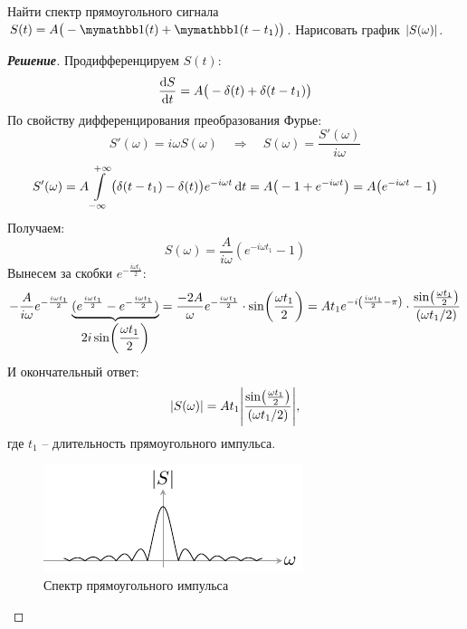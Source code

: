 \begin{task}
	Найти спектр прямоугольного сигнала $S(t)=A\big(-\H(t)+\H(t-t_1)\big)$.
	Нарисовать график $\abs{S(\omega)}$.
\end{task}

\begin{proof}[\rm{\textbf{Решение}}]
	Продифференцируем $S(t)$:
	\begin{equation}
		\dv{S}{t}=A\big(-\delta(t)+\delta(t-t_1)\big)
	\end{equation}
	По свойству дифференцирования преобразования Фурье:
	\begin{equation}
		S'(\omega)=i \omega S(\omega) 
			\quad\Longrightarrow\quad
			S(\omega)=\frac{S'(\omega)}{i \omega}
	\end{equation}
	\begin{gather*}
		S'(\omega)=A\int\limits_{-\infty}^{+\infty} \big(\delta(t-t_1)-\delta(t)\big)e^{-i \omega t} \dd{t}
			=A\big(-1 +e^{-i \omega t}\big) = A\big(e^{-i \omega t} -1\big)
	\end{gather*}
	Получаем:
	\begin{equation}
		S(\omega)=\frac{A}{i \omega} (e^{-i \omega t_1}-1)
	\end{equation}
	Вынесем за скобки $e^{-\frac{i \omega t_1}{2}}$:
	\begin{equation}
		-\frac{A}{i \omega} e^{-\frac{i \omega t_1}{2}}
		\underbrace{
			(e^{\frac{i \omega t_1}{2}} 
			-e^{-\frac{i \omega t_1}{2}})}
			_{\displaystyle 2i\sin(\frac{\omega t_1}{2})}=
		\frac{-2A}{\omega}
			e^{-\frac{i \omega t_1}{2}}
			\cdot\sin(\frac{\omega t_1}{2})=\\
		At_1e^{-i\qty(\frac{i \omega t_1}{2}-\pi)}\cdot 
		\frac{\sin(\frac{\omega t_1}{2})}{\qty(\omega t_1/2)}
	\end{equation}
	И окончательный ответ:
	\begin{equation}
		\abs{S(\omega)}=At_1
			\abs{
				\frac{\sin(\frac{\omega t_1}{2})}{\qty(\omega t_1/2)}
			},
	\end{equation}
	где $t_1$ -- длительность прямоугольного импульса.
	\begin{figure}[h!]
		\centering
		\includegraphics[scale=1.8]{ris/task5_out}		
		\caption{Спектр прямоугольного импульса}
	\end{figure}

\end{proof} 